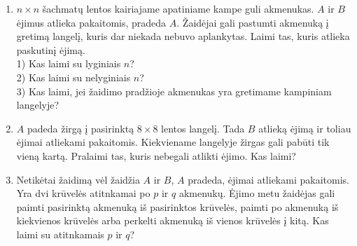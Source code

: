 \begin{enumerate}
  \item  $n\times n$ šachmatų lentos kairiajame apatiniame kampe guli akmenukas.
    $A$ ir $B$ ėjimus atlieka pakaitomis, pradeda $A$. Žaidėjai gali pastumti
    akmenuką į gretimą langelį, kuris dar niekada nebuvo aplankytas. Laimi tas,
    kuris atlieka paskutinį ėjimą.\\
    1) Kas laimi su lyginiais $n$? \\
    2) Kas laimi su nelyginiais $n$? \\
    3) Kas laimi, jei žaidimo pradžioje akmenukas yra gretimame kampiniam langelyje?

  \item $A$ padeda žirgą  į pasirinktą  $8\times 8$ lentos langelį. Tada $B$
    atlieką ėjimą ir toliau ėjimai atliekami pakaitomis. Kiekviename
    langelyje žirgas gali pabūti tik vieną kartą. Pralaimi tas, kuris
    nebegali atlikti ėjimo. Kas laimi?

  \item Netikėtai žaidimą vėl žaidžia $A$ ir $B$, $A$ pradeda, ėjimai atliekami
    pakaitomis. Yra dvi krūvelės atitnkamai po $p$ ir $q$ akmenukų. Ėjimo metu
    žaidėjas gali paimti pasirinktą akmenuką iš pasirinktos krūvelės, paimti po
    akmenuką iš kiekvienos krūvelės arba perkelti akmenuką iš vienos krūvelės į
    kitą. Kas laimi su atitnkamais $p$ ir $q$?


\end{enumerate}
